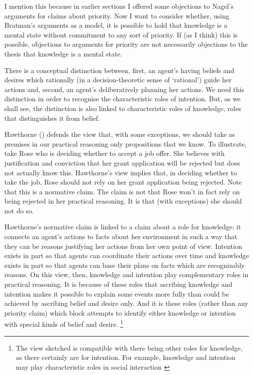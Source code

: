 \documentclass[11pt,a4paper]{extarticle}
\begin{document}
I mention this because in earlier sections I offered some objections to Nagel's arguments for claims about priority.
Now I want to
consider whether, using Bratman's arguments as a model,
it is possible to  hold that
 knowledge is a mental state 
without
commitment to any sort of priority.
If (as I think) this is possible, 
objections to arguments for priority 
are not necessarily
objections to the thesis that knowledge is a mental state.


There is a conceptual distinction between,
first,
an agent's having beliefs and desires which rationally 
(in a decision-theoretic sense of `rational') 
guide her actions
and,
second,
 an agent's deliberatively planning her actions.
We need this distinction in order to recognise the characteristic roles of intention.
But, as we shall see, the distinction is also linked to characteristic roles of knowledge, roles that distinguishes it from belief.

Hawthorne (\citeyear[pp.\ 29--31]{Hawthorne:2004ov}) defends the view that, with some exceptions, we should take as premises in our practical reasoning only propositions that we know.  
To illustrate, take Rose who is deciding whether to accept a job offer.
She believes with justification and conviction that her grant application will be rejected but does not actually know this.  
Hawthorne's view implies that, in deciding whether to take the job, Rose should not rely on her grant application being rejected.  
Note that this is a normative claim.  
The claim is not that Rose won't in fact rely on being rejected in her practical reasoning.  
It is that (with exceptions) she should not do so.  

Hawthorne's normative claim is linked to a claim about a role for knowledge: 
it connects an agent's actions to facts about her environment in such a way that they can be reasons justifying her actions from her own point of view.
Intention exists in part so that agents can coordinate their actions over time 
and 
knowledge exists in part so that agents can base their plans on facts which are recognizably reasons.
On this view, then, knowledge and intention play complementary roles in practical reasoning.
It is because of these roles that ascribing knowledge and intention makes it possible to explain some events more fully than could be achieved by ascribing belief and desire only.
And it is these roles 
(rather than any priority claim)
which block attempts to identify either knowledge or intention with special kinds of belief and desire.%
\footnote{
The view sketched is compatible with there being other roles for knowledge, as there certainly are for intention.
For example, knowledge and intention may play characteristic roles in social interaction 
\citep{Craig:1990wt,Bratman:2009lv}
}
\end{document}
